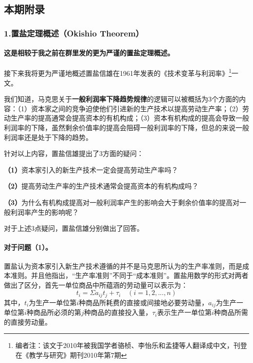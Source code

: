 \documentclass[a4paper,twoside,12pt,AutoFakeBold]{ctexart}
\begin{document}
\newpage
\subsection{本期附录}
\subsubsection{1.置盐定理概述（Okishio Theorem）}
\paragraph{这是相较于我之前在群里发的更为严谨的置盐定理概述。} 

接下来我将更为严谨地概述置盐信雄在1961年发表的《技术变革与利润率》\footnote{编者注：该文于2010年被我国学者骆桢、李怡乐和孟捷等人翻译成中文，刊登在《教学与研究》期刊2010年第7期}一文。

\vspace{0.5cm} %

我们知道，马克思关于\textbf{一般利润率下降趋势规律}的逻辑可以被概括为3个方面的内容：（1）资本家之间的竞争迫使他们引进新的生产技术以提高劳动生产率；（2）劳动生产率的提高通常会提高资本的有机构成；（3）资本有机构成的提高会导致一般利润率的下降，虽然剩余价值率的提高会阻碍一般利润率的下降，但总的来说一般利润率还是处于下降的趋势。

针对以上内容，置盐信雄提出了3方面的疑问：
\begin{tcolorbox}[colback=gray!20, colframe=gray!100, sharp corners, leftrule={3pt}, rightrule={0pt}, toprule={0pt}, bottomrule={0pt}, left={2pt}, right={2pt}, top={3pt}, bottom={3pt}] 
\textbf{（1）}资本家引入的新生产技术一定会提高劳动生产率吗？

\textbf{（2）}提高劳动生产率的生产技术通常会提高资本的有机构成吗？

\textbf{（3）}为什么有机构成提高对一般利润率产生的影响会大于剩余价值率的提高对一般利润率产生的影响呢？

\end{tcolorbox}


对于上述3点疑问，置盐信雄分别做出了回答。

\paragraph{对于问题（1）。}置盐认为资本家引入新生产技术遵循的并不是马克思所认为的生产率准则，而是成本准则。并且他指出，“生产率准则”不同于“成本准则”。置盐用数学的形式对两者做出了区分，首先一单位商品中所蕴涵的劳动量可以表示为：
\begin{equation}\tag{1}
    t_i=\Sigma a_{ij}t_j+\tau_i \quad (i=1,2,...,n)
\end{equation}
其中，$t_i$为生产一单位第$i$种商品所耗费的直接或间接地必要劳动量，$a_{ij}$为生产一单位第$i$种商品所必须的第$j$种商品的直接投入量，$\tau_i$表示生产一单位第$i$种商品所需的直接劳动量。
\end{document}
